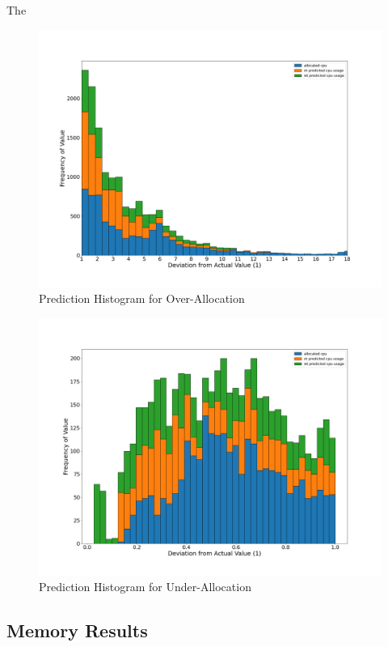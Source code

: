 \documentclass{article}
\begin{document}
    The 
    \begin{figure}[h!]
      \centering
      \includegraphics[width=1\textwidth]{figures/df_over_alloc_hist.png}
      \caption{Prediction Histogram for Over-Allocation}
      \label{fig:over-aloc-cpu-hist}
    \end{figure}

    \begin{figure}[h!]
      \centering
      \includegraphics[width=1\textwidth]{figures/df_under_alloc_hist.png}
      \caption{Prediction Histogram for Under-Allocation}
      \label{fig:under-aloc-hist}
    \end{figure}

  \subsection{Memory Results}
  \label{sec:mem-results}
\end{document}
